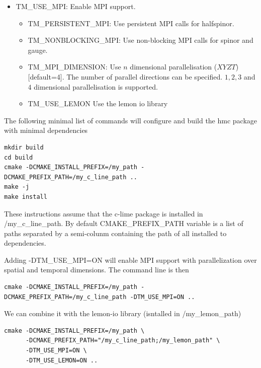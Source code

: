 \begin{itemize}
\begin{itemize}
    include and lib directories) that are needed to compile hmc.
  \item \textcolor{red}{\ttfamily QMP\_DIR}: Directory where QMP is installed (
    QPhiX dependency).
    The QPhiX current CMake build system does not export all information about the
    include and lib directories nor its dependencies (QMP in that case).
  \end{itemize}
\item {\ttfamily TM\_USE\_MPI}: Enable MPI support.
  \begin{itemize}
  \item {\ttfamily TM\_PERSISTENT\_MPI}: Use persistent MPI calls for halfspinor.
  \item {\ttfamily TM\_NONBLOCKING\_MPI}: Use non-blocking MPI calls for spinor and
    gauge.
  \item {\ttfamily TM\_MPI\_DIMENSION}: Use $n$ dimensional parallelisation ($XYZT$)
    [default=4]. The number of parallel directions can be specified. $1, 2, 3$ and $4$
    dimensional parallelisation is supported.
  \item {\ttfamily TM\_USE\_LEMON} Use the lemon io library
  \end{itemize}
\end{itemize}

The following minimal list of commands will configure and build the hmc package with
minimal dependencies
\begin{verbatim}
mkdir build
cd build
cmake -DCMAKE_INSTALL_PREFIX=/my_path -DCMAKE_PREFIX_PATH=/my_c_line_path ..
make -j
make install
\end{verbatim}

These instructions assume that the {\ttfamily c-lime} package is installed in {\ttfamily
  /my\_c\_line\_path}. By default {\ttfamily CMAKE\_PREFIX\_PATH} variable is a list
of paths separated by a semi-colunm containing the path of all installed to
dependencies.

Adding {\ttfamily -DTM\_USE\_MPI=ON} will enable MPI support with parallelization
over spatial and temporal dimensions. The command line is then
\begin{verbatim}
cmake -DCMAKE_INSTALL_PREFIX=/my_path -DCMAKE_PREFIX_PATH=/my_c_line_path -DTM_USE_MPI=ON ..
\end{verbatim}
We can combine it with the lemon-io library (isntalled in {\ttfamily /my\_lemon\_path})
\begin{verbatim}
cmake -DCMAKE_INSTALL_PREFIX=/my_path \
      -DCMAKE_PREFIX_PATH="/my_c_line_path;/my_lemon_path" \
      -DTM_USE_MPI=ON \
      -DTM_USE_LEMON=ON ..
\end{verbatim}

